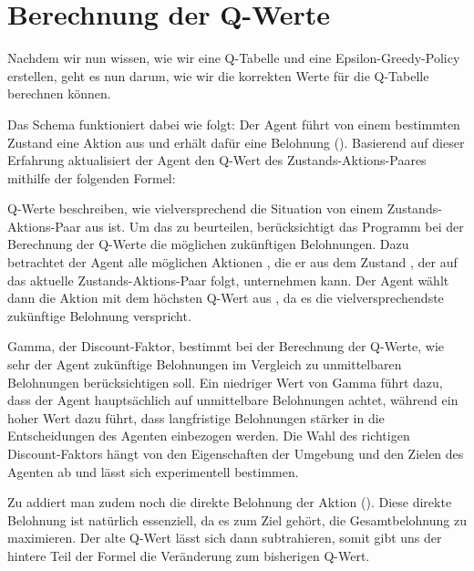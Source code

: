 \section{Berechnung der Q-Werte}

Nachdem wir nun wissen, wie wir eine Q-Tabelle und eine Epsilon-Greedy-Policy erstellen, geht es nun darum, wie wir die korrekten Werte für die Q-Tabelle berechnen können.

Das Schema funktioniert dabei wie folgt: Der Agent führt von einem bestimmten Zustand  eine Aktion  aus und erhält dafür eine Belohnung (). Basierend auf dieser Erfahrung aktualisiert der Agent den Q-Wert des Zustands-Aktions-Paares  mithilfe der folgenden Formel:

\medskip


\medskip

Q-Werte beschreiben, wie vielversprechend die Situation von einem Zustands-Aktions-Paar aus ist. Um das zu beurteilen, berücksichtigt das Programm bei der Berechnung der Q-Werte die möglichen zukünftigen Belohnungen. Dazu betrachtet der Agent alle möglichen Aktionen , die er aus dem Zustand , der auf das aktuelle Zustands-Aktions-Paar  folgt, unternehmen kann. Der Agent wählt dann die Aktion mit dem höchsten Q-Wert aus , da es die vielversprechendste zukünftige Belohnung verspricht.

Gamma, der Discount-Faktor, bestimmt bei der Berechnung der Q-Werte, wie sehr der Agent zukünftige Belohnungen im Vergleich zu unmittelbaren Belohnungen berücksichtigen soll. Ein niedriger Wert von Gamma führt dazu, dass der Agent hauptsächlich auf unmittelbare Belohnungen achtet, während ein hoher Wert dazu führt, dass langfristige Belohnungen stärker in die Entscheidungen des Agenten einbezogen werden. Die Wahl des richtigen Discount-Faktors hängt von den Eigenschaften der Umgebung und den Zielen des Agenten ab und lässt sich experimentell bestimmen.

Zu  addiert man zudem noch die direkte Belohnung der Aktion (). Diese direkte Belohnung ist natürlich essenziell, da es zum Ziel gehört, die Gesamtbelohnung zu maximieren. Der alte Q-Wert  lässt sich dann subtrahieren, somit gibt uns der hintere Teil der Formel die Veränderung zum bisherigen Q-Wert.

